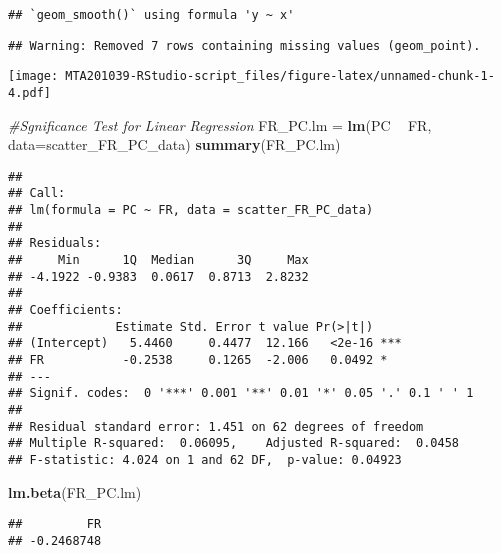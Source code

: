 \documentclass[
]{article}
\newenvironment{Shaded}{\begin{snugshade}}{\end{snugshade}}
\newcommand{\CommentTok}[1]{\textcolor[rgb]{0.56,0.35,0.01}{\textit{#1}}}
\newcommand{\DataTypeTok}[1]{\textcolor[rgb]{0.13,0.29,0.53}{#1}}
\newcommand{\KeywordTok}[1]{\textcolor[rgb]{0.13,0.29,0.53}{\textbf{#1}}}
\newcommand{\NormalTok}[1]{#1}
\newcommand{\OperatorTok}[1]{\textcolor[rgb]{0.81,0.36,0.00}{\textbf{#1}}}
\newcommand{\StringTok}[1]{\textcolor[rgb]{0.31,0.60,0.02}{#1}}
\begin{document}
\begin{verbatim}
## `geom_smooth()` using formula 'y ~ x'
\end{verbatim}

\begin{verbatim}
## Warning: Removed 7 rows containing missing values (geom_point).
\end{verbatim}

\texttt{[image: MTA201039-RStudio-script\_files/figure-latex/unnamed-chunk-1-4.pdf]}

\begin{Shaded}
\begin{Highlighting}[]
\CommentTok{#Sgnificance Test for Linear Regression}
\NormalTok{FR_PC.lm =}\StringTok{ }\KeywordTok{lm}\NormalTok{(PC }\OperatorTok{~}\StringTok{ }\NormalTok{FR, }\DataTypeTok{data=}\NormalTok{scatter_FR_PC_data)}
\KeywordTok{summary}\NormalTok{(FR_PC.lm)}
\end{Highlighting}
\end{Shaded}

\begin{verbatim}
## 
## Call:
## lm(formula = PC ~ FR, data = scatter_FR_PC_data)
## 
## Residuals:
##     Min      1Q  Median      3Q     Max 
## -4.1922 -0.9383  0.0617  0.8713  2.8232 
## 
## Coefficients:
##             Estimate Std. Error t value Pr(>|t|)    
## (Intercept)   5.4460     0.4477  12.166   <2e-16 ***
## FR           -0.2538     0.1265  -2.006   0.0492 *  
## ---
## Signif. codes:  0 '***' 0.001 '**' 0.01 '*' 0.05 '.' 0.1 ' ' 1
## 
## Residual standard error: 1.451 on 62 degrees of freedom
## Multiple R-squared:  0.06095,    Adjusted R-squared:  0.0458 
## F-statistic: 4.024 on 1 and 62 DF,  p-value: 0.04923
\end{verbatim}

\begin{Shaded}
\begin{Highlighting}[]
\KeywordTok{lm.beta}\NormalTok{(FR_PC.lm)}
\end{Highlighting}
\end{Shaded}

\begin{verbatim}
##         FR 
## -0.2468748
\end{verbatim}

\begin{Shaded}
\end{Shaded}
\end{document}
